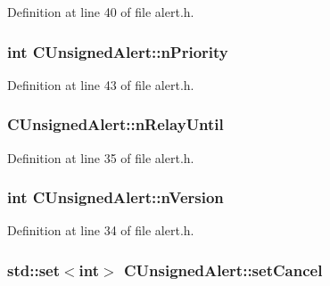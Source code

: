 Definition at line 40 of file alert.\+h.

\hypertarget{class_c_unsigned_alert_acf7253ae21d58a8633faab0635f5f5f5}{}
\subsubsection[{n\+Priority}]{\setlength{\rightskip}{0pt plus 5cm}int C\+Unsigned\+Alert\+::n\+Priority}\label{class_c_unsigned_alert_acf7253ae21d58a8633faab0635f5f5f5}


Definition at line 43 of file alert.\+h.

\hypertarget{class_c_unsigned_alert_a13bb82aef8b496584f6b3ae6424f8e58}{}
\subsubsection[{n\+Relay\+Until}]{ C\+Unsigned\+Alert\+::n\+Relay\+Until}\label{class_c_unsigned_alert_a13bb82aef8b496584f6b3ae6424f8e58}


Definition at line 35 of file alert.\+h.

\hypertarget{class_c_unsigned_alert_ad8fad8e8f62caaf8162fad19170de2cf}{}
\subsubsection[{n\+Version}]{\setlength{\rightskip}{0pt plus 5cm}int C\+Unsigned\+Alert\+::n\+Version}\label{class_c_unsigned_alert_ad8fad8e8f62caaf8162fad19170de2cf}


Definition at line 34 of file alert.\+h.

\hypertarget{class_c_unsigned_alert_ab1978ea23d02720d515bcdcf9d0dbdb0}{}
\subsubsection[{set\+Cancel}]{\setlength{\rightskip}{0pt plus 5cm}std\+::set$<$int$>$ C\+Unsigned\+Alert\+::set\+Cancel}\label{class_c_unsigned_alert_ab1978ea23d02720d515bcdcf9d0dbdb0}


